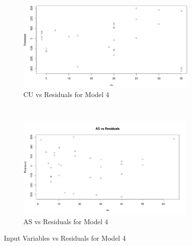 \documentclass[a4paper,12pt, english]{article}
\begin{document}
\begin{figure}[H]
        \centering
        \begin{subfigure}[b]{0.85\textwidth}
                \includegraphics[width=0.986\textwidth]{mod4-resid1}
  		\caption{CU vs Residuals for Model 4}
  		\label{fig:mod4-resid1}
        \end{subfigure}%
        ~ %
        
        \begin{subfigure}[b]{0.85\textwidth}
                \includegraphics[width=0.96986\textwidth]{mod4-resid2}
  		\caption{AS vs Residuals for Model 4}
 		 \label{fig:mod4-resid2}
        \end{subfigure}
        
        \caption{Input Variables vs Residuals for Model 4}
        \label{fig:mod4-resids}
\end{figure}
\end{document}
